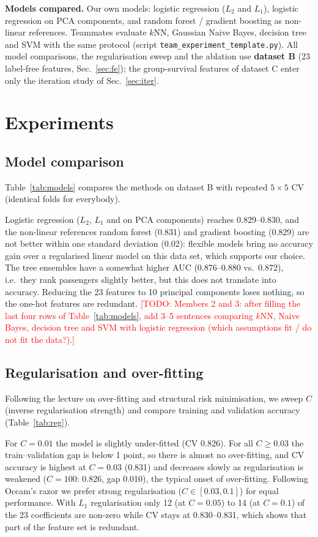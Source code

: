 \documentclass[10pt,twocolumn]{article}
\newcommand{\todo}[1]{\textcolor{red}{[TODO: #1]}}
\begin{document}
\textbf{Models compared.} Our own models: logistic regression ($L_2$ and $L_1$), logistic regression on PCA components, and random forest / gradient boosting as non-linear references. Teammates evaluate $k$NN, Gaussian Naive Bayes, decision tree and SVM with the same protocol (script \texttt{team\_experiment\_template.py}). All model comparisons, the regularisation sweep and the ablation use \textbf{dataset B} (23 label-free features, Sec.~\ref{sec:fe}); the group-survival features of dataset C enter only the iteration study of Sec.~\ref{sec:iter}.

\section{Experiments}
\subsection{Model comparison}
Table~\ref{tab:models} compares the methods on dataset B with repeated $5\times5$ CV (identical folds for everybody).

Logistic regression ($L_2$, $L_1$ and on PCA components) reaches 0.829--0.830, and the non-linear references random forest (0.831) and gradient boosting (0.829) are not better within one standard deviation (0.02): flexible models bring no accuracy gain over a regularised linear model on this data set, which supports our choice. The tree ensembles have a somewhat higher AUC (0.876--0.880 vs.\ 0.872), i.e.\ they rank passengers slightly better, but this does not translate into accuracy. Reducing the 23 features to 10 principal components loses nothing, so the one-hot features are redundant.
\todo{Members 2 and 3: after filling the last four rows of Table~\ref{tab:models}, add 3--5 sentences comparing $k$NN, Naive Bayes, decision tree and SVM with logistic regression (which assumptions fit / do not fit the data?).}

\subsection{Regularisation and over-fitting}\label{sec:reg}
Following the lecture on over-fitting and structural risk minimisation, we sweep $C$ (inverse regularisation strength) and compare training and validation accuracy (Table~\ref{tab:reg}).

For $C=0.01$ the model is slightly under-fitted (CV 0.826). For all $C\ge0.03$ the train--validation gap is below 1 point, so there is almost no over-fitting, and CV accuracy is highest at $C=0.03$ (0.831) and decreases slowly as regularisation is weakened ($C=100$: 0.826, gap 0.010), the typical onset of over-fitting. Following Occam's razor we prefer strong regularisation ($C\in[0.03,0.1]$) for equal performance. With $L_1$ regularisation only 12 (at $C=0.05$) to 14 (at $C=0.1$) of the 23 coefficients are non-zero while CV stays at 0.830--0.831, which shows that part of the feature set is redundant.
\end{document}

